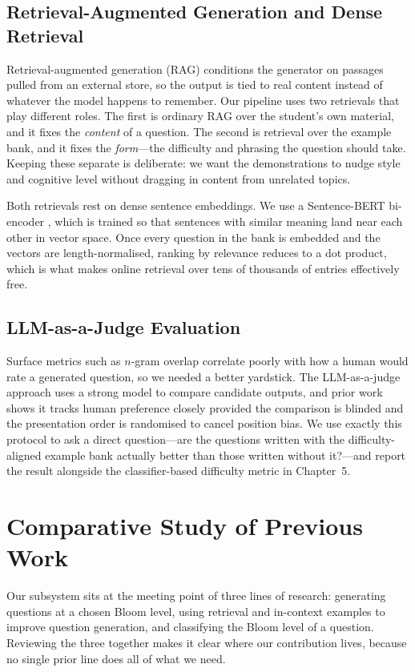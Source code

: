 \documentclass[12pt,a4paper]{report}
\begin{document}
\subsection{Retrieval-Augmented Generation and Dense Retrieval}
Retrieval-augmented generation (RAG) \parencite{lewis2020rag} conditions the
generator on passages pulled from an external store, so the output is tied to
real content instead of whatever the model happens to remember. Our pipeline uses
two retrievals that play different roles. The first is ordinary RAG over the
student's own material, and it fixes the \emph{content} of a question. The second
is retrieval over the example bank, and it fixes the \emph{form}---the difficulty
and phrasing the question should take. Keeping these separate is deliberate: we
want the demonstrations to nudge style and cognitive level without dragging in
content from unrelated topics.

Both retrievals rest on dense sentence embeddings. We use a Sentence-BERT
bi-encoder \parencite{reimers2019sbert}, which is trained so that sentences with
similar meaning land near each other in vector space. Once every question in the
bank is embedded and the vectors are length-normalised, ranking by relevance
reduces to a dot product, which is what makes online retrieval over tens of
thousands of entries effectively free.

\subsection{LLM-as-a-Judge Evaluation}
Surface metrics such as $n$-gram overlap correlate poorly with how a human would
rate a generated question, so we needed a better yardstick. The
LLM-as-a-judge approach \parencite{zheng2023judge} uses a strong model to compare
candidate outputs, and prior work shows it tracks human preference closely
provided the comparison is blinded and the presentation order is randomised to
cancel position bias. We use exactly this protocol to ask a direct question---are
the questions written with the difficulty-aligned example bank actually better
than those written without it?---and report the result alongside the
classifier-based difficulty metric in Chapter~5.

\section{Comparative Study of Previous Work}
Our subsystem sits at the meeting point of three lines of research: generating
questions at a chosen Bloom level, using retrieval and in-context examples to
improve question generation, and classifying the Bloom level of a question.
Reviewing the three together makes it clear where our contribution lives, because
no single prior line does all of what we need.
\end{document}
